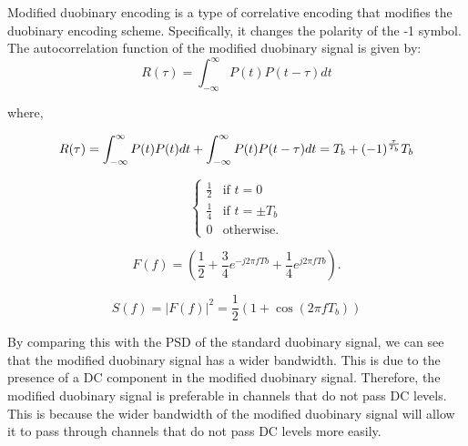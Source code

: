 \documentclass[14pt,a4paper]{report}
\begin{document}
\begin{answer_box*}

    Modified duobinary encoding is a type of correlative encoding that modifies the duobinary encoding scheme. 
    Specifically, it changes the polarity of the -1 symbol.\\
    The autocorrelation function of the modified duobinary signal is given by:
\begin{equation}
    R(\tau ) = \int_{-\infty}^{\infty} P (t)P (t - \tau )dt
\end{equation}

where,

\begin{equation}
    R(\tau ) = \int_{-\infty}^{\infty} P (t)P (t)dt + \int_{-\infty}^{\infty} P (t)P (t - \tau )dt \\
     = T_b + (-1)^{\frac{\tau}{T_b}}T_b \\
\end{equation}

\begin{equation}
    \begin{cases}
        \frac{1}{2} & \text{if } t = 0 \\
        \frac{1}{4} & \text{if } t = \pm T_b \\
        0 & \text{otherwise.}
    \end{cases}
\end{equation}

\begin{equation}
    F (f ) = \left(\frac{1}{2} + \frac{3}{4} e^{-j2\pi f T b } + \frac{1}{4} e^{j2\pi f T b}\right).
\end{equation}

\begin{equation}
    S(f) = |F(f)|^2 = \frac{1}{2} \left(1 + \cos(2\pi fT_b)\right)
\end{equation}

By comparing this with the PSD of the standard duobinary signal, we can see that the modified duobinary signal has a wider bandwidth. This is due to the presence of a DC component in the modified duobinary signal.
Therefore, the modified duobinary signal is preferable in channels that do not pass DC levels. This is because the wider bandwidth of the modified duobinary signal will allow it to pass through channels that do not pass DC levels more easily.

\end{answer_box*}
\end{document}
